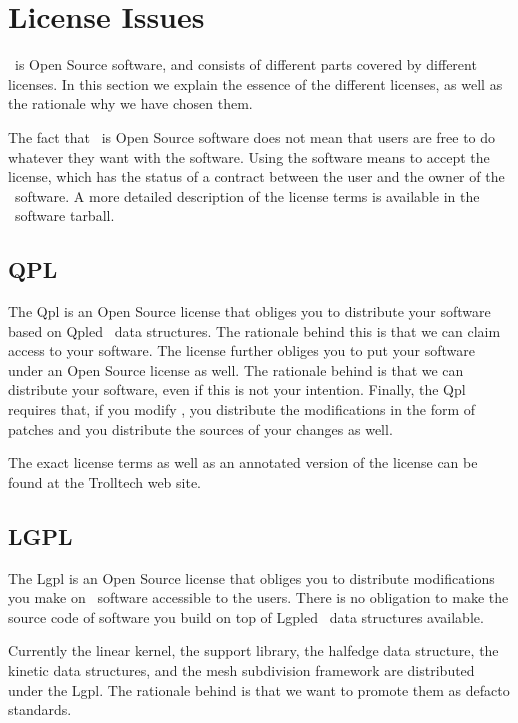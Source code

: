 
\section{License Issues}

\cgal\ is Open Source software, and consists of different parts covered by
different licenses.  In this section we explain the essence of the different
licenses, as well as the rationale why we have chosen them. 

The fact that \cgal\ is Open Source software does not mean that users are free
to do whatever they want with the software. Using the software means to accept
the license, which has the status of a contract between the user and the owner
of the \cgal\ software.  A more detailed description of the license terms is
available in the \cgal\ software tarball.


\subsection{QPL \label{licenses:QPL}}

The {\sc Qpl} is an Open Source license that obliges you to distribute your
software based on {\sc Qpl}ed \cgal\ data structures.  The rationale behind
this is that we can claim access to your software.  The license further obliges
you to put your software under an Open Source license as well. The rationale
behind is that we can distribute your software, even if this is not your
intention.  Finally, the {\sc Qpl} requires that, if you modify \cgal, you
distribute the modifications in the form of patches and you distribute the
sources of your changes as well.


The exact license terms as well as an annotated version of the license can be
found at the Trolltech web site.

\subsection{LGPL \label{licenses:LGPL}}

The {\sc Lgpl} is an Open Source license that obliges you to distribute
modifications you make on \cgal\ software accessible to the users. There is no
obligation to make the source code of software you build on top of {\sc Lgpl}ed
\cgal\ data structures available.

Currently the linear kernel, the support library, the halfedge data structure,
the kinetic data structures, and the mesh subdivision framework are distributed
under the {\sc Lgpl}. The rationale behind is that we want to promote them as
defacto standards.

